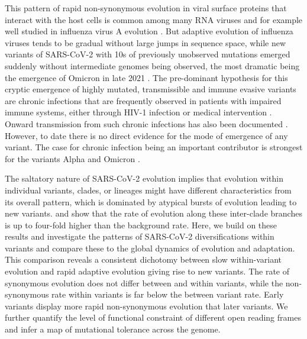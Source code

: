 \documentclass[aps,rmp, twocolumn]{revtex4}
\begin{document}
This pattern of rapid non-synonymous evolution in viral surface proteins that interact with the host cells is common among many RNA viruses and for example well studied in influenza virus A evolution \citep{bhatt_genomic_2011,strelkowa_clonal_2012}.
But adaptive evolution of influenza viruses tends to be gradual without large jumps in sequence space, while new variants of SARS-CoV-2 with 10s of previously unobserved mutations emerged suddenly without intermediate genomes being observed, the most dramatic being the emergence of Omicron in late 2021 \citep{viana_rapid_2022}.
The pre-dominant hypothesis for this cryptic emergence of highly mutated, transmissible and immune evasive variants are chronic infections that are frequently observed in patients with impaired immune systems, either through HIV-1 infection \citep{cele_sars-cov-2_2022} or medical intervention \citep{choi_persistence_2020,kemp_sars-cov-2_2021}.
Onward transmission from such chronic infections has also been documented \citep{gonzalez-reiche_intrahost_2022}.
However, to date there is no direct evidence for the mode of emergence of any variant.
The case for chronic infection being an important contributor is strongest for the variants Alpha and Omicron \citep{hill_origins_2022}.

The saltatory nature of SARS-CoV-2 evolution implies that evolution within individual variants, clades, or lineages might have different characteristics from its overall pattern, which is dominated by atypical bursts of evolution leading to new variants.
\citet{tay_emergence_2022} and \citet{hill_origins_2022} show that the rate of evolution along these inter-clade branches is up to four-fold higher than the background rate.
Here, we build on these results and investigate the patterns of SARS-CoV-2 diversifications within variants and compare these to the global dynamics of evolution and adaptation.
This comparison reveals a consistent dichotomy between slow within-variant evolution and rapid adaptive evolution giving rise to new variants.
The rate of synonymous evolution does not differ between and within variants, while the non-synonymous rate within variants is far below the between variant rate.
Early variants display more rapid non-synonymous evolution that later variants.
We further quantify the level of functional constraint of different open reading frames and infer a map of mutational tolerance across the genome.
\end{document}
